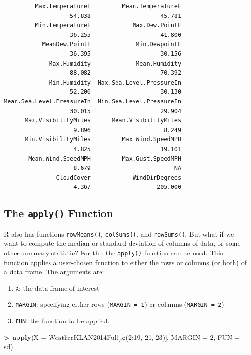\documentclass[]{krantz}
\makeatletter
\newenvironment{Shaded}{\begin{snugshade}}{\end{snugshade}}
\newcommand{\KeywordTok}[1]{\textcolor[rgb]{0.27,0.27,0.27}{\textbf{#1}}}
\newcommand{\DataTypeTok}[1]{\textcolor[rgb]{0.27,0.27,0.27}{#1}}
\newcommand{\DecValTok}[1]{\textcolor[rgb]{0.06,0.06,0.06}{#1}}
\newcommand{\StringTok}[1]{\textcolor[rgb]{0.5,0.5,0.5}{#1}}
\newcommand{\OperatorTok}[1]{\textcolor[rgb]{0.43,0.43,0.43}{\textbf{#1}}}
\newcommand{\NormalTok}[1]{#1}
\providecommand{\tightlist}{%
  \setlength{\itemsep}{0pt}\setlength{\parskip}{0pt}}
\newenvironment{kframe}{%
\medskip{}
\setlength{\fboxsep}{.8em}
 \def\at@end@of@kframe{}%
 \ifinner\ifhmode%
  \def\at@end@of@kframe{\end{minipage}}%
  \begin{minipage}{\columnwidth}%
 \fi\fi%
 \def\FrameCommand##1{\hskip\@totalleftmargin \hskip-\fboxsep
 \colorbox{shadecolor}{##1}\hskip-\fboxsep
     \hskip-\linewidth \hskip-\@totalleftmargin \hskip\columnwidth}%
 \MakeFramed {\advance\hsize-\width
   \@totalleftmargin\z@ \linewidth\hsize
   \@setminipage}}%
 {\par\unskip\endMakeFramed%
 \at@end@of@kframe}
\renewenvironment{Shaded}{\begin{kframe}}{\end{kframe}}
\makeatother
\begin{document}
\begin{verbatim}
         Max.TemperatureF         Mean.TemperatureF 
                   54.838                    45.781 
         Min.TemperatureF            Max.Dew.PointF 
                   36.255                    41.800 
           MeanDew.PointF             Min.DewpointF 
                   36.395                    30.156 
             Max.Humidity             Mean.Humidity 
                   88.082                    70.392 
             Min.Humidity  Max.Sea.Level.PressureIn 
                   52.200                    30.130 
Mean.Sea.Level.PressureIn  Min.Sea.Level.PressureIn 
                   30.015                    29.904 
      Max.VisibilityMiles      Mean.VisibilityMiles 
                    9.896                     8.249 
      Min.VisibilityMiles         Max.Wind.SpeedMPH 
                    4.825                    19.101 
       Mean.Wind.SpeedMPH         Max.Gust.SpeedMPH 
                    8.679                        NA 
               CloudCover            WindDirDegrees 
                    4.367                   205.000 
\end{verbatim}

\subsection{\texorpdfstring{The \texttt{apply()}
Function}{The apply() Function}}\label{apply}

R also has functions \texttt{rowMeans()}, \texttt{colSums()}, and
\texttt{rowSums()}. But what if we want to compute the median or
standard deviation of columns of data, or some other summary statistic?
For this the \texttt{apply()} function can be used. This function
applies a user-chosen function to either the rows or columns (or both)
of a data frame. The arguments are:

\begin{enumerate}
\def\labelenumi{\arabic{enumi}.}
\tightlist
\item
  \texttt{X}: the data frame of interest
\item
  \texttt{MARGIN}: specifying either rows (\texttt{MARGIN\ =\ 1}) or
  columns (\texttt{MARGIN\ =\ 2})
\item
  \texttt{FUN}: the function to be applied.
\end{enumerate}

\begin{Shaded}
\begin{Highlighting}[]
\OperatorTok{>}\StringTok{ }\KeywordTok{apply}\NormalTok{(}\DataTypeTok{X =}\NormalTok{ WeatherKLAN2014Full[,}\KeywordTok{c}\NormalTok{(}\DecValTok{2}\OperatorTok{:}\DecValTok{19}\NormalTok{, }\DecValTok{21}\NormalTok{, }\DecValTok{23}\NormalTok{)], }\DataTypeTok{MARGIN =} \DecValTok{2}\NormalTok{, }\DataTypeTok{FUN =}\NormalTok{ sd)}
\end{Highlighting}
\end{Shaded}
\end{document}
